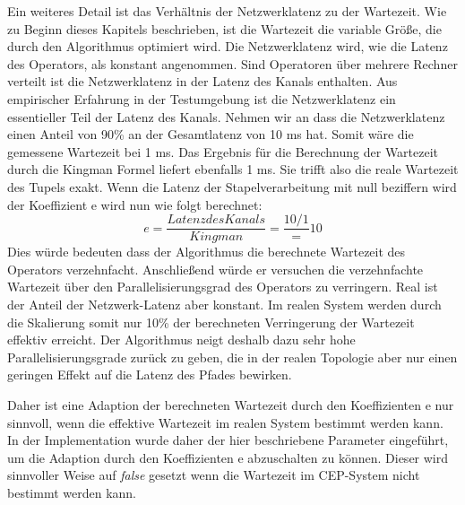 Ein weiteres Detail ist das Verhältnis der Netzwerklatenz zu der Wartezeit.
Wie zu Beginn dieses Kapitels beschrieben, ist die Wartezeit die variable Größe, die durch den Algorithmus optimiert wird.
Die Netzwerklatenz wird, wie die Latenz des Operators, als konstant angenommen.
Sind Operatoren über mehrere Rechner verteilt ist die Netzwerklatenz in der Latenz des Kanals enthalten.
Aus empirischer Erfahrung in der Testumgebung ist die Netzwerklatenz ein essentieller Teil der Latenz des Kanals.
Nehmen wir an dass die Netzwerklatenz einen Anteil von 90\% an der Gesamtlatenz von 10 ms hat.
Somit wäre die gemessene Wartezeit bei 1 ms.
Das Ergebnis für die Berechnung der Wartezeit durch die Kingman Formel liefert ebenfalls 1 ms.
Sie trifft also die reale Wartezeit des Tupels exakt.
Wenn die Latenz der Stapelverarbeitung mit null beziffern wird der Koeffizient e wird nun wie folgt berechnet:
\[ e = \frac{Latenz des Kanals}{Kingman} = \frac{10 / 1} = 10\]
Dies würde bedeuten dass der Algorithmus die berechnete Wartezeit des Operators verzehnfacht.
Anschließend würde er versuchen die verzehnfachte Wartezeit über den Parallelisierungsgrad des Operators zu verringern.
Real ist der Anteil der Netzwerk-Latenz aber konstant.
Im realen System werden durch die Skalierung somit nur 10\% der berechneten Verringerung der Wartezeit effektiv erreicht.
Der Algorithmus neigt deshalb dazu sehr hohe Parallelisierungsgrade zurück zu geben, die in der realen Topologie aber nur einen geringen Effekt auf die Latenz des Pfades bewirken.

Daher ist eine Adaption der berechneten Wartezeit durch den Koeffizienten e nur sinnvoll, wenn die effektive Wartezeit im realen System bestimmt werden kann.
In der Implementation wurde daher der hier beschriebene Parameter eingeführt, um die Adaption durch den Koeffizienten e abzuschalten zu können.
Dieser wird sinnvoller Weise auf \textit{false} gesetzt wenn die Wartezeit im CEP-System nicht bestimmt werden kann.

















